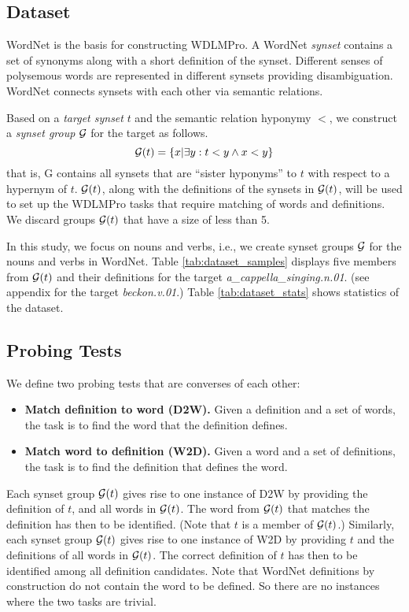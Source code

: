 \documentclass[11pt,a4paper]{article}
\begin{document}
\subsection{Dataset}
WordNet \cite{miller95wordnet} is the basis for
constructing WDLMPro.  A WordNet \textit{synset} contains a
set of synonyms along with a short definition of
the synset.  Different senses of polysemous words are
represented in different synsets providing
disambiguation. WordNet connects synsets with each other via
semantic relations.

Based on a \emph{target synset}
$t$ and the semantic relation hyponymy $<$, we construct
a \emph{synset group} $\cal G$ for the target as follows.
\[
  {\cal G}(t) = \{ x | \exists y: t<y \wedge x<y \}
  \]
that is, {\cal G} contains all synsets that are ``sister
hyponyms'' to $t$ with respect to a hypernym of $t$.
${\cal G}(t)$, along with the definitions of the synsets in
${\cal G}(t)$,
will be used to
set up the WDLMPro tasks that require matching of words and definitions.
We discard groups ${\cal G}(t)$ that
have a size of less than 5.


In this study, we focus on nouns and verbs, i.e., we create
synset groups ${\cal G}$ for the nouns and verbs in WordNet.
Table
\ref{tab:dataset_samples} displays five members from ${\cal
  G} (t)$ 
and their definitions
for the target
\emph{a\_cappella\_singing.n.01}. (see appendix for the target \emph{beckon.v.01}.)
Table \ref{tab:dataset_stats} shows statistics of the dataset.
  


\subsection{Probing Tests}

We define two probing tests that are converses of each other:
\begin{itemize}
  \item \textbf{Match definition to word (D2W).} Given a
    definition and a set of words, the task is to find the
    word that the definition defines.
  \item \textbf{Match word to definition (W2D).} Given a
    word and a set of definitions, the task is to find the
    definition that defines the word.
    \end{itemize}
Each synset group ${\cal G}(t)$ gives rise to one instance
of D2W by providing the definition of $t$, and all words in
${\cal G}(t)$. The word from ${\cal G}(t)$ that matches the
definition has then to be identified. (Note that $t$ is a
member of ${\cal G}(t)$.)
Similarly, each synset group ${\cal G}(t)$ gives rise to one instance
of W2D by providing $t$ and the definitions of all words in
${\cal G}(t)$. The
correct definition  of $t$ has then to be identified among
all definition  candidates. Note that WordNet definitions by
construction do not contain the word to be defined. So there
are no instances where the two tasks are trivial.
\end{document}
